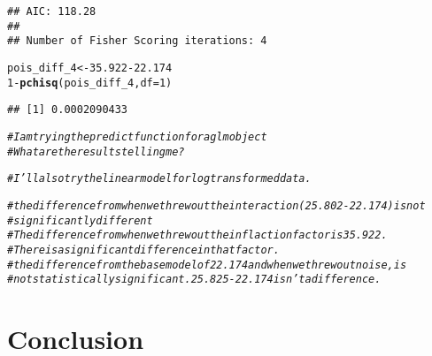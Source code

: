 \documentclass[12pt]{article}\usepackage[]{graphicx}\usepackage[]{color}
\makeatletter
\newcommand{\hlnum}[1]{\textcolor[rgb]{0.686,0.059,0.569}{#1}}%
\newcommand{\hlcom}[1]{\textcolor[rgb]{0.678,0.584,0.686}{\textit{#1}}}%
\newcommand{\hlopt}[1]{\textcolor[rgb]{0,0,0}{#1}}%
\newcommand{\hlstd}[1]{\textcolor[rgb]{0.345,0.345,0.345}{#1}}%
\newcommand{\hlkwb}[1]{\textcolor[rgb]{0.69,0.353,0.396}{#1}}%
\newcommand{\hlkwc}[1]{\textcolor[rgb]{0.333,0.667,0.333}{#1}}%
\newcommand{\hlkwd}[1]{\textcolor[rgb]{0.737,0.353,0.396}{\textbf{#1}}}%
\newenvironment{kframe}{%
 \def\at@end@of@kframe{}%
 \ifinner\ifhmode%
  \def\at@end@of@kframe{\end{minipage}}%
  \begin{minipage}{\columnwidth}%
 \fi\fi%
 \def\FrameCommand##1{\hskip\@totalleftmargin \hskip-\fboxsep
 \colorbox{shadecolor}{##1}\hskip-\fboxsep
     \hskip-\linewidth \hskip-\@totalleftmargin \hskip\columnwidth}%
 \MakeFramed {\advance\hsize-\width
   \@totalleftmargin\z@ \linewidth\hsize
   \@setminipage}}%
 {\par\unskip\endMakeFramed%
 \at@end@of@kframe}
\newenvironment{knitrout}{}{} %
\makeatother
\begin{document}
\begin{knitrout}
\begin{kframe}
\begin{verbatim}
## AIC: 118.28
## 
## Number of Fisher Scoring iterations: 4
\end{verbatim}
\begin{alltt}
\hlstd{pois_diff_4} \hlkwb{<-} \hlnum{35.922} \hlopt{-} \hlnum{22.174}
\hlnum{1} \hlopt{-} \hlkwd{pchisq}\hlstd{(pois_diff_4,} \hlkwc{df}\hlstd{=}\hlnum{1}\hlstd{)}
\end{alltt}
\begin{verbatim}
## [1] 0.0002090433
\end{verbatim}
\begin{alltt}
\hlcom{#I am trying the predict function for a glm object}
\hlcom{#What are the results telling me? }


\hlcom{#I'll also try the linear model for log transformed data.}

\hlcom{#the difference from when we threw out the interaction (25.802 - 22.174) is not}
\hlcom{#significantly different}
\hlcom{#The difference from when we threw out the inflaction factor is 35.922. }
\hlcom{#There is a significant difference in that factor.}
\hlcom{#the difference from the base model of 22.174 and when we threw out noise, is }
\hlcom{#not statistically significant. 25.825-22.174 isn't a difference. }
\end{alltt}
\end{kframe}
\end{knitrout}

\section{Conclusion}
\end{document}
